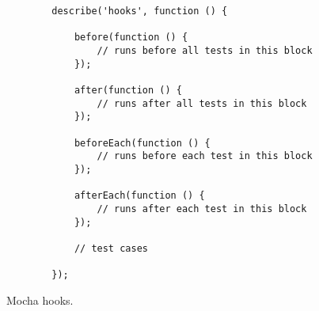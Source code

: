 \begin{figure}[H]
	\centering
	\begin{lstlisting}
		describe('hooks', function () {

			before(function () {
				// runs before all tests in this block
			});

			after(function () {
				// runs after all tests in this block
			});

			beforeEach(function () {
				// runs before each test in this block
			});

			afterEach(function () {
				// runs after each test in this block
			});

			// test cases

		});
	\end{lstlisting}
	\caption[Mocha hooks]{Mocha hooks.}
	\label{fig:mocha_hooks}
\end{figure}
